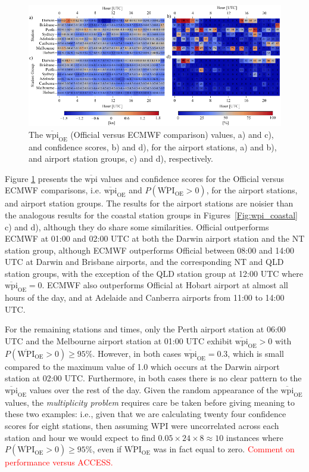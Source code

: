 \documentclass[alpha-refs]{wiley-article}
\begin{document}
\begin{figure}
\centering
\includegraphics{airport_wpi.pdf}
\caption{The $\overline{\text{wpi}}_\text{OE}$ (Official versus ECMWF comparison) values, a) and c), and confidence scores, b) and d), for the airport stations, a) and b), and airport station groups, c) and d), respectively.}
\label{Fig:airport_wpi}
\end{figure}

Figure \ref{Fig:airport_wpi} presents the $\overline{\text{wpi}}$ values and confidence scores for the Official versus ECMWF comparisons, i.e. $\overline{\text{wpi}}_\text{OE}$ and $P\left(\overline{\text{WPI}}_\text{OE}>0\right)$, for the airport stations, and airport station groups. The results for the airport stations are noisier than the analogous results for the coastal station groups in Figures~\ref{Fig:wpi_coastal} c) and d), although they do share some similarities. Official outperforms ECMWF at 01:00 and 02:00 UTC at both the Darwin airport station and the NT station group, although ECMWF outperforms Official between 08:00 and 14:00 UTC at Darwin and Brisbane airports, and the corresponding NT and QLD station groups, with the exception of the QLD station group at 12:00 UTC where $\overline{\text{wpi}}_\text{OE} = 0$. ECMWF also outperforms Official at Hobart airport at almost all hours of the day, and at Adelaide and Canberra airports from 11:00 to 14:00 UTC. 

For the remaining stations and times, only the Perth airport station at 06:00 UTC and the Melbourne airport station at 01:00 UTC exhibit $\overline{\text{wpi}}_\text{OE}>0$ with $P\left(\overline{\text{WPI}}_\text{OE}>0\right)\geq 95\%$. However, in both cases $\overline{\text{wpi}}_\text{OE}=0.3$, which is small compared to the maximum value of 1.0 which occurs at the Darwin airport station at 02:00 UTC. Furthermore, in both cases there is no clear pattern to the $\overline{\text{wpi}}_\text{OE}$ values over the rest of the day. Given the random appearance of the $\overline{\text{wpi}}_\text{OE}$ values, the \textit{multiplicity problem} \citep[p. 178]{wilks11} requires care be taken before giving meaning to these two examples: i.e., given that we are calculating twenty four confidence scores for eight stations, then assuming WPI were uncorrelated across each station and hour we would expect to find $0.05 \times 24 \times 8 \approx 10$ instances where $P\left(\overline{\text{WPI}}_\text{OE}>0\right)\geq 95\%$, even if $\overline{\text{WPI}}_\text{OE}$ was in fact equal to zero. \textcolor{red}{Comment on performance versus ACCESS.}
\end{document}
